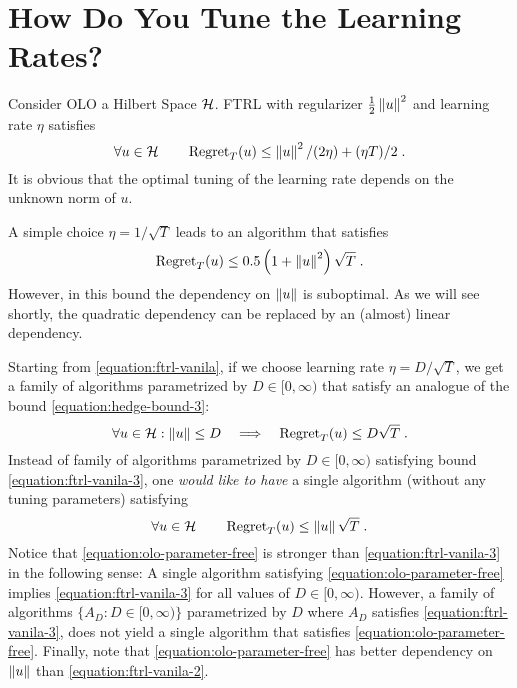 \section{How Do You Tune the Learning Rates?}
\label{section:learning-rates}

Consider \ac{OLO} a Hilbert Space $\mathcal{H}$. \ac{FTRL} with regularizer
$\tfrac{1}{2}\left\|{u}\right\|^2$ and learning rate $\eta$ satisfies~\cite{???}
\begin{equation}
\label{equation:ftrl-vanila}
\forall u \in \mathcal{H} \qquad \operatorname{Regret}_T(u) \le \left\|{u}\right\|^2/(2\eta) + (\eta T)/2 \; .
\end{equation}
It is obvious that the optimal tuning of the learning rate depends on the
unknown norm of $u$.

A simple choice $\eta = 1/\sqrt{T}$ leads to an algorithm that satisfies
\begin{equation}
\label{equation:ftrl-vanila-2}
\operatorname{Regret}_T(u) \le 0.5\left(1+\left\|{u}\right\|^2\right)\sqrt{T} \; .
\end{equation}
However, in this bound the dependency on $\left\|{u}\right\|$ is suboptimal. As we will
see shortly, the quadratic dependency can be replaced by an (almost) linear
dependency.

Starting from \eqref{equation:ftrl-vanila}, if we choose learning rate $\eta =
D/\sqrt{T}$, we get a family of algorithms parametrized by $D \in [0,\infty)$
that satisfy an analogue of the bound \eqref{equation:hedge-bound-3}:
\begin{equation}
\label{equation:ftrl-vanila-3}
\forall u \in \mathcal{H} : \left\|{u}\right\| \le D \quad  \Longrightarrow \quad \operatorname{Regret}_T(u) \le D \sqrt{T} \; .
\end{equation}
Instead of family of algorithms parametrized by $D \in [0,\infty)$ satisfying
bound \eqref{equation:ftrl-vanila-3}, one \emph{would like
to have} a single algorithm (without any tuning parameters) satisfying
\begin{equation}
\label{equation:olo-parameter-free}
\forall u \in \mathcal{H} \qquad \operatorname{Regret}_T(u) \le \left\|{u}\right\| \sqrt{T} \; .
\end{equation}
Notice that \eqref{equation:olo-parameter-free} is stronger than
\eqref{equation:ftrl-vanila-3} in the following sense: A single algorithm
satisfying \eqref{equation:olo-parameter-free} implies
\eqref{equation:ftrl-vanila-3} for all values of $D \in [0,\infty)$. However,
a family of algorithms $\{A_D : D \in [0,\infty)\}$ parametrized by $D$ where
$A_D$ satisfies \eqref{equation:ftrl-vanila-3}, does not yield a single
algorithm that satisfies \eqref{equation:olo-parameter-free}.  Finally, note
that \eqref{equation:olo-parameter-free} has better dependency on $\left\|{u}\right\|$
than \eqref{equation:ftrl-vanila-2}.

